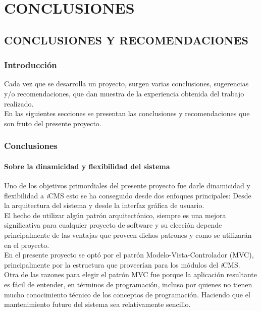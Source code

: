 \part{CONCLUSIONES}

\chapter{CONCLUSIONES Y RECOMENDACIONES}
\newpage

\section{Introducci\'on}
Cada vez que se desarrolla un proyecto, surgen varias conclusiones, sugerencias y/o recomendaciones, que dan muestra de la experiencia obtenida del trabajo realizado.\\
En las siguientes secciones se presentan las conclusiones y recomendaciones que son fruto del presente proyecto.

\section{Conclusiones}

\subsection{Sobre la dinamicidad y flexibilidad del sistema}
Uno de los objetivos primordiales del presente proyecto fue darle dinamicidad y flexibilidad a \textit{i}CMS esto se ha conseguido desde dos enfoques principales: Desde la arquitectura del sistema y desde la interfaz gr\'afica de usuario.\\

El hecho de utilizar alg\'un patr\'on arquitect\'onico, siempre es una mejora significativa para cualquier proyecto de software y su elecci\'on depende principalmente de las ventajas que proveen dichos patrones y como se utilizar\'an en el proyecto.\\
En el presente proyecto se opt\'o por el patr\'on Modelo-Vista-Controlador (MVC), principalmente por la estructura que proveer\'ian para los m\'odulos del \textit{i}CMS.\\
Otra de las razones para elegir el patr\'on MVC fue porque la aplicaci\'on resultante es f\'acil de entender, en t\'erminos de programaci\'on, incluso por quienes no tienen mucho conocimiento t\'ecnico de los conceptos de programaci\'on. Haciendo que el mantenimiento futuro del sistema sea relativamente sencillo.\\

